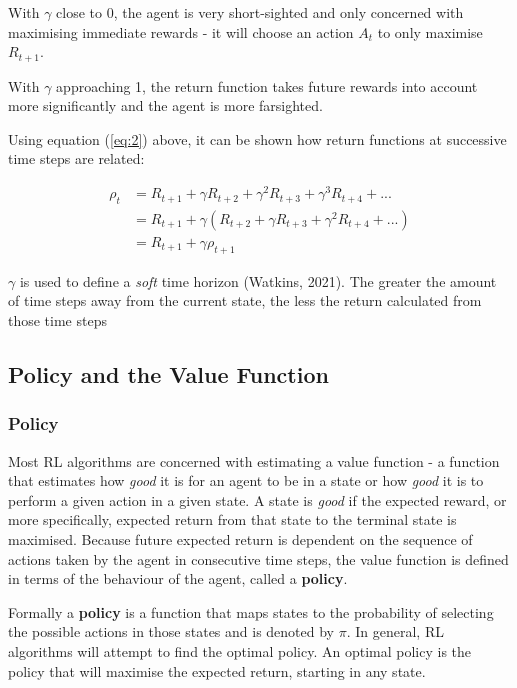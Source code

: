 \documentclass{article}
\begin{document}
With $\gamma$ close to 0, the agent is very short-sighted and only concerned with maximising immediate rewards - it will choose an action $A_t$ to only maximise $R_{t+1}$.

With $\gamma$ approaching 1, the return function takes future rewards into account more significantly and the agent is more farsighted. 

Using equation (\ref{eq:2}) above, it can be shown how return functions at successive time steps are related\cite{Sutton1998}\cite{RLNotes}:

\begin{align}
\rho_t &= R_{t+1} + \gamma R_{t+2} +  \gamma^2R_{t+3} + \gamma^3R_{t+4} + ... \nonumber \\
     &= R_{t+1} + \gamma (R_{t+2} + \gamma R_{t+3} + \gamma^2 R_{t+4} + ... )  \nonumber \\
     &= R_{t+1} + \gamma \rho_{t+1} 
\end{align}

$\gamma$ is used to define a \textit{soft} time horizon (Watkins, 2021). The greater the amount of time steps away from the current state, the less the return calculated from those time steps


\subsection{Policy and the Value Function}

\subsubsection{Policy}

Most RL algorithms are concerned with estimating a value function - a function that estimates how \textit{good} it is for an agent to be in a state or how \textit{good} it is to perform a given action in a given state. A state is \textit{good} if the expected reward, or more specifically, expected return from that state to the terminal state is maximised\cite{Sutton1998}. Because future expected return is dependent on the sequence of actions taken by the agent in consecutive time steps, the value function is defined in terms of the behaviour of the agent, called a \textbf{policy}.

Formally a \textbf{policy} is a function that maps states to the probability of selecting the possible actions in those states and is denoted by $\pi$. In general, RL algorithms will attempt to find the optimal policy. An optimal policy is the policy that will maximise the expected return, starting in any state.
\end{document}
